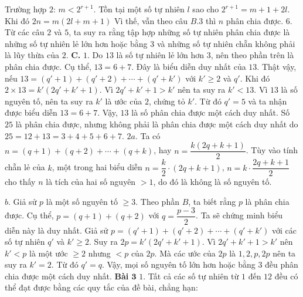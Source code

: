 \begin{multicols}{2}
Trường hợp $2$: $m<2^{r+1}$. Tồn tại một số tự nhiên $l$ sao cho $2^{r+1}=m+1+2l$. Khi đó $2n=m(2l+m+1)$ Vì thế, vẫn theo câu $B.3$ thì $n$ phân chia được.  
\vskip 0.05cm
$6.$ Từ các câu $2$ và $5$, ta suy ra rằng tập hợp những số tự nhiên phân chia được là những số tự nhiên lẻ lớn hơn hoặc bằng $3$ và những số tự nhiên chẵn không phải là lũy thừa của $2$. 
\vskip 0.05cm
\textbf{\color{cackithi} C.}
$1.$ Do $13$ là số tự nhiên lẻ lớn hơn $3$, nên theo phần trên là phân chia được. Cụ thể, $13=6+7$. Đây là biểu diễn duy nhất của $13$. Thật vậy, nếu $13=(q'+1)+(q'+2)+\cdots+(q'+k')$ với $k'\ge 2$ và $q' $. Khi đó $2\times 13=k'(2q'+k'+1)$. Vì $2q'+k'+1>k'$ nên ta suy ra $k'<13$. Vì $13$ là số nguyên tố, nên ta suy ra $k'$ là ước của $2$, chứng tỏ $k'$. Từ đó $q'=5$ và ta nhận được biểu diễn $13=6+7$. Vậy, $13$ là số phân chia được một cách duy nhất. 
\vskip 0.05cm
Số $25$ là phân chia được, nhưng không phải là phân chia được một cách duy nhất do $25=12+13=3+4+5+6+7$.
\vskip 0.05cm 
$2a.$ Ta có $n=(q+1)+(q+2)+\cdots+(q+k)$, hay $n=\dfrac{k(2q+k+1)}{2}$. Tùy vào tính chẵn lẻ của $k$, một trong hai biểu diễn $n= \dfrac{k}{2}\cdot (2q+k+1)$, $n =k\cdot \dfrac{2q+ k+1}{2}$ cho thấy $n$ là tích của hai số nguyên $>1$, do đó là không là số nguyên tố. 

\vskip 0.05cm 
$b$. Giả sử $p$ là một số nguyên tố $\ge 3$. Theo phần $B$, ta biết rằng $p$ là phân chia được. Cụ thể, $p=(q+1)+(q+2)$ với $q=\dfrac{p-3}{2}$. Ta sẽ chứng minh biểu diễn này là duy nhất. Giả sử $p=(q'+1)+(q'+2)+\cdots+(q'+k')$ với các số tự nhiên $q'$ và $k'\ge 2$. Suy ra $2 p=k'(2q'+k'+1)$. Vì $2q'+k'+1>k'$ nên $k'<p$ là một ước $\ge 2$ nhưng $<p$ của $2p$. Mà các ước của $2p$ là $1, 2, p, 2p$ nên ta suy ra $k'=2$. Từ đó $q'=q$. Vậy, mọi số nguyên tố lớn hơn hoặc bằng $3$ đều phân chia được một cách duy nhất. 
\vskip 0.05cm
\textbf{\color{cackithi}Bài $\pmb{3}$} 
\vskip 0.05cm
$1.$ Tất cả các số tự nhiên từ $1$ đến $12$ đều có thể đạt được bằng các quy tắc của đề bài, chẳng hạn:
\vskip 0.05cm


\end{multicols}
